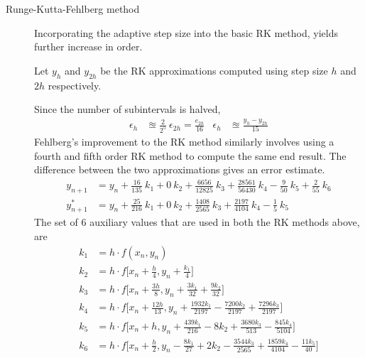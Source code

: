 \begin{description}
    \item[Runge-Kutta-Fehlberg method] Incorporating the adaptive step size into the
        basic RK method, yields further increase in order.
        \par Let $ y_h $ and $ y_{2h} $ be the RK approximations computed using step
        size $ h $ and $ 2h $  respectively. \par
        Since the number of subintervals is halved,
        \begin{align}
            \epsilon_{h} & \approxeq \frac{2}{2^5}\ \epsilon_{2h} = \frac{e_{2h}}{16} &
            \epsilon_h   & \approxeq \frac{y_h - y_{2h}}{15}
        \end{align}
        Fehlberg's improvement to the RK method similarly involves using a fourth and
        fifth order RK method to compute the same end result. The difference between
        the two approximations gives an error estimate.
        \begin{align}
            y_{n+1}   & = y_n + \frac{16}{135}\ k_1 + 0\ k_2 + \frac{6656}{12825}\ k_3
            + \frac{28561}{56430}\ k_4 - \frac{9}{50}\ k_5 + \frac{2}{55}\ k_6         \\
            y^*_{n+1} & = y_n + \frac{25}{216}\ k_1 + 0\ k_2 + \frac{1408}{2565}\ k_3
            + \frac{2197}{4104}\ k_4 - \frac{1}{5}\ k_5
        \end{align}
        The set of 6 auxiliary values that are used in both the RK methods above, are
        \begin{align}
            k_1 & = h \cdot f(x_n, y_n)                                             \\
            k_2 & = h \cdot f\Bigg[x_n + \frac{h}{4}, y_n + \frac{k_1}{4}\Bigg]     \\
            k_3 & = h \cdot f\Bigg[x_n + \frac{3h}{8}, y_n + \frac{3k_1}{32}
            + \frac{9k_2}{32}\Bigg]                                                 \\
            k_4 & = h \cdot f\Bigg[x_n + \frac{12h}{13}, y_n + \frac{1932k_1}{2197}
            - \frac{7200k_2}{2197} + \frac{7296k_3}{2197} \Bigg]                    \\
            k_5 & = h \cdot f\Bigg[x_n + h, y_n + \frac{439k_1}{216}
            - 8k_2 + \frac{3680k_3}{513} - \frac{845k_4}{5104} \Bigg]               \\
            k_6 & = h \cdot f\Bigg[x_n + \frac{h}{2}, y_n - \frac{8k_1}{27}
                + 2k_2 - \frac{3544k_3}{2565} + \frac{1859k_4}{4104} - \frac{11k_5}{40}
                \Bigg]
        \end{align}


\end{description}
